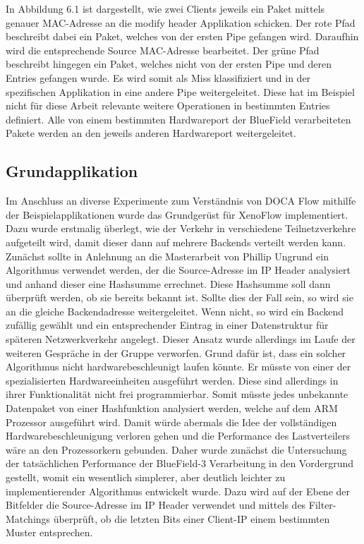 In Abbildung 6.1 ist dargestellt, wie zwei Clients jeweils ein Paket mittels genauer MAC-Adresse an die modify header Applikation schicken. Der rote Pfad beschreibt dabei ein Paket, welches von der ersten Pipe gefangen wird. Daraufhin wird die entsprechende Source MAC-Adresse bearbeitet. Der grüne Pfad beschreibt hingegen ein Paket, welches nicht von der ersten Pipe und deren Entries gefangen wurde. Es wird somit als Miss klassifiziert und in der spezifischen Applikation in eine andere Pipe weitergeleitet. Diese hat im Beispiel nicht für diese Arbeit relevante weitere Operationen in bestimmten Entries definiert. Alle von einem bestimmten Hardwareport der BlueField verarbeiteten Pakete werden an den jeweils anderen Hardwareport weitergeleitet.
\subsection{Grundapplikation}
Im Anschluss an diverse Experimente zum Verständnis von DOCA Flow mithilfe der Beispielapplikationen wurde das Grundgerüst für XenoFlow implementiert. Dazu wurde erstmalig überlegt, wie der Verkehr in verschiedene Teilnetzverkehre aufgeteilt wird, damit dieser dann auf mehrere Backends verteilt werden kann. Zunächst sollte in Anlehnung an die Masterarbeit von Phillip Ungrund ein Algorithmus verwendet werden, der die Source-Adresse im IP Header analysiert und anhand dieser eine Hashsumme errechnet. Diese Hashsumme soll dann überprüft werden, ob sie bereits bekannt ist. Sollte dies der Fall sein, so wird sie an die gleiche Backendadresse weitergeleitet. Wenn nicht, so wird ein Backend zufällig gewählt und ein entsprechender Eintrag in einer Datenstruktur für späteren Netzwerkverkehr angelegt. Dieser Ansatz wurde allerdings im Laufe der weiteren Gespräche in der Gruppe verworfen. Grund dafür ist, dass ein solcher Algorithmus nicht hardwarebeschleunigt laufen könnte. Er müsste von einer der spezialisierten Hardwareeinheiten ausgeführt werden. Diese sind allerdings in ihrer Funktionalität nicht frei programmierbar. Somit müsste jedes unbekannte Datenpaket von einer Hashfunktion analysiert werden, welche auf dem ARM Prozessor ausgeführt wird. Damit würde abermals die Idee der vollständigen Hardwarebeschleunigung verloren gehen und die Performance des Lastverteilers wäre an den Prozessorkern gebunden. Daher wurde zunächst die Untersuchung der tatsächlichen Performance der BlueField-3 Verarbeitung in den Vordergrund gestellt, womit ein wesentlich simplerer, aber deutlich leichter zu implementierender Algorithmus entwickelt wurde. Dazu wird auf der Ebene der Bitfelder die Source-Adresse im IP Header verwendet und mittels des Filter-Matchings überprüft, ob die letzten Bits einer Client-IP einem bestimmten Muster entsprechen.
